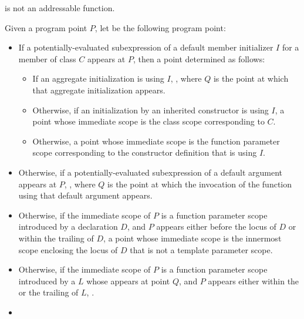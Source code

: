 \begin{itemdescr}
\pnum
{} is not an addressable function.

\pnum
Given a program point $P$,
let  be the following program point:
\begin{itemize}
\item
  If a potentially-evaluated subexpression
  of a default member initializer $I$
  for a member of class $C$
  appears at $P$,
  then a point determined as follows:
  \begin{itemize}
  \item
    If an aggregate initialization is using $I$,
    ,
    where $Q$ is the point at which that aggregate initialization appears.
  \item
    Otherwise, if an initialization
    by an inherited constructor is using $I$,
    a point whose immediate scope is the class scope corresponding to $C$.
  \item
    Otherwise, a point whose immediate scope
    is the function parameter scope
    corresponding to the constructor definition that is using $I$.
  \end{itemize}
  \item
    Otherwise, if a potentially-evaluated subexpression
    of a default argument appears at $P$,
    ,
    where $Q$ is the point at which the invocation of the function
    using that default argument appears.
  \item
    Otherwise, if the immediate scope of $P$
    is a function parameter scope introduced by a declaration $D$,
    and $P$ appears either before the locus of $D$
    or within the trailing  of $D$,
    a point whose immediate scope is the innermost scope enclosing the locus of $D$
    that is not a template parameter scope.
  \item
    Otherwise, if the immediate scope of $P$
    is a function parameter scope
    introduced by a  $L$
    whose  appears at point $Q$,
    and $P$ appears either within the 
    or the trailing  of $L$,
    .
  \item

\end{itemize}
\end{itemdescr}
